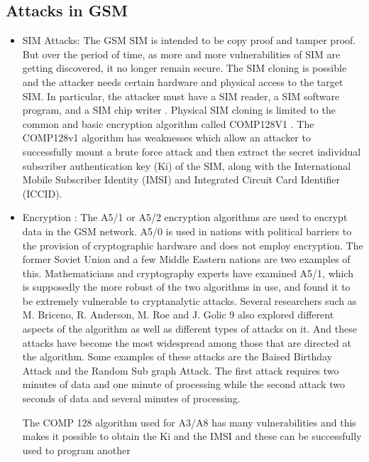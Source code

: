 \documentclass[conference]{IEEEtran}
\begin{document}
\begin{itemize}
\subsection{Attacks in GSM}
\begin{itemize}
    \item SIM Attacks: The GSM SIM is intended to be copy proof and tamper proof. But over the period of time, as more and more vulnerabilities
    of SIM are getting discovered, it no longer remain secure. The SIM cloning is possible and the attacker needs certain 
    hardware and physical access to the target SIM. In particular, the attacker must have a SIM reader, a SIM software program, and a SIM chip writer \cite{quirke2004security} \cite{sidharsancomplete}.
    Physical SIM cloning is limited to the common and basic encryption algorithm called COMP128V1 \cite{quirke2004security} \cite{sidharsancomplete}. The COMP128v1 algorithm has weaknesses which allow an attacker 
    to successfully mount a brute force attack and then extract the secret individual subscriber authentication key (Ki) of the SIM, along with the International Mobile Subscriber Identity (IMSI) and Integrated Circuit Card Identifier (ICCID).
    \cite{singh2013gsm}

    \item Encryption : The A5/1 or A5/2 encryption algorithms are used to encrypt data in the GSM network. A5/0 is used in nations with political barriers to the provision of cryptographic hardware and does not employ encryption.
    The former Soviet Union and a few Middle Eastern nations are two examples of this. 
    Mathematicians and cryptography experts have examined A5/1, which is supposedly the more robust of the two algorithms in use, and found it to be extremely vulnerable to cryptanalytic attacks.
    Several researchers such as M. Briceno, R. Anderson, M. Roe and J. Golic 9 also explored different aspects of the algorithm as well as different types of attacks on it. 
    And these attacks have become the most widespread among those that are directed at the algorithm. Some examples of these attacks are the Baised Birthday Attack and the Random Sub graph Attack. 
    The first attack requires two minutes of data and one minute of processing while the second attack two seconds of data and several minutes of processing. \cite{lord2003modern}
    
    The COMP 128 algorithm used for A3/A8 has many vulnerabilities and this makes it possible to obtain the Ki and the IMSI and
    these can be successfully used to program another \cite{rao2002partitioning}


\end{itemize}
\end{itemize}
\end{document}
